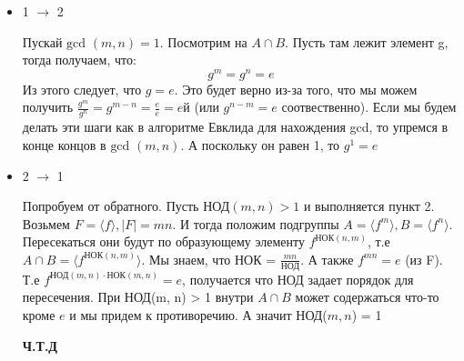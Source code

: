\documentclass[a4paper,12pt]{article}
\begin{document}
\begin{itemize}
\item 1 $\rightarrow$ 2 

Пускай $\text{gcd }(m, n) = 1$. Посмотрим на $A \cap B$. Пусть там лежит элемент g, тогда получаем, что:
\[
g^m = g^n = e
\]
Из этого следует, что $g = e$. Это будет верно из-за того, что мы можем получить $\frac{g^m}{g^n} = g^{m - n} = \frac{e}{e} = eй$ (или $g^{n - m} = e$ соотвественно). Если мы будем делать эти шаги как в алгоритме Евклида для нахождения gcd, то упремся в конце концов в $\text{gcd }(m, n)$. А поскольку он равен 1, то $g^1 = e$
\item 2 $\rightarrow$ 1

Попробуем от обратного. Пусть НОД$(m, n) > 1$ и выполняется пункт 2. Возьмем $F = \langle f \rangle, |F| = mn $. И тогда положим подгруппы $A = \langle f^m \rangle, B = \langle f^n \rangle$. 
Пересекаться они будут по образующему элементу $f^{\text{НОК}(n, m)}$, т.е $A \cap B = \langle f^{\text{НОК}(n, m)} \rangle$. Мы знаем, что НОК = $\frac{mn}{\text{НОД}}$. А также $f^{mn} = e$ (из  F). Т.е $f^{\text{НОД} (m, n)  \cdot \text{НОК}(m, n)} = e$, получается что НОД задает порядок для пересечения. При НОД(m, n) > 1 внутри $A \cap B$ может содержаться что-то кроме $e$ и мы придем к противоречию. А значит НОД($m, n$) = 1
\begin{center}
\textbf{Ч.Т.Д}  
\end{center}
\end{itemize}
\end{document}
